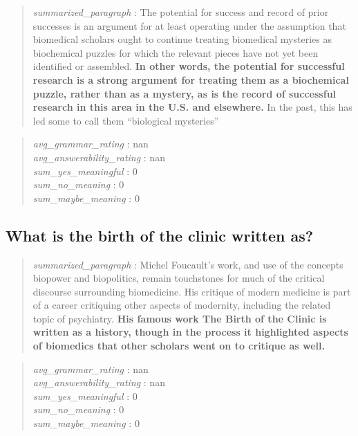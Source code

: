 \begin{quote}
\emph{summarized\_paragraph} : The potential for success and record of
prior successes is an argument for at least operating under the
assumption that biomedical scholars ought to continue treating
biomedical mysteries as biochemical puzzles for which the relevant
pieces have not yet been identified or assembled. \textbf{In other
words, the potential for successful research is a strong argument for
treating them as a biochemical puzzle, rather than as a mystery, as is
the record of successful research in this area in the U.S. and
elsewhere.} In the past, this has led some to call them ``biological
mysteries''
\end{quote}

\begin{quote}
\emph{avg\_grammar\_rating} : nan\\
\emph{avg\_answerability\_rating} : nan\\
\emph{sum\_yes\_meaningful} : 0\\
\emph{sum\_no\_meaning} : 0\\
\emph{sum\_maybe\_meaning} : 0
\end{quote}

\hypertarget{what-is-the-birth-of-the-clinic-written-as}{%
\subsection{What is the birth of the clinic written
as?}\label{what-is-the-birth-of-the-clinic-written-as}}

\begin{quote}
\emph{summarized\_paragraph} : Michel Foucault's work, and use of the
concepts biopower and biopolitics, remain touchstones for much of the
critical discourse surrounding biomedicine. His critique of modern
medicine is part of a career critiquing other aspects of modernity,
including the related topic of psychiatry. \textbf{His famous work The
Birth of the Clinic is written as a history, though in the process it
highlighted aspects of biomedics that other scholars went on to critique
as well.}
\end{quote}

\begin{quote}
\emph{avg\_grammar\_rating} : nan\\
\emph{avg\_answerability\_rating} : nan\\
\emph{sum\_yes\_meaningful} : 0\\
\emph{sum\_no\_meaning} : 0\\
\emph{sum\_maybe\_meaning} : 0
\end{quote}


